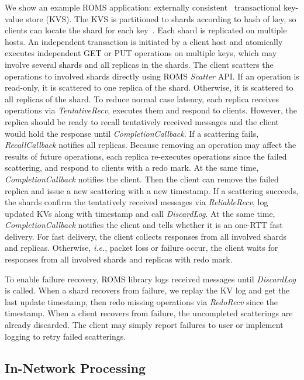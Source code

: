 We show an example ROMS application: externally consistent~\cite{corbett2013spanner} transactional key-value store (KVS).
The KVS is partitioned to shards according to hash of key, so clients can locate the shard for each key~\cite{nishtala2013scaling,eris}.
Each shard is replicated on multiple hosts.
An independent transaction is initiated by a client host and atomically executes independent GET or PUT operations on multiple keys, which may involve several shards and all replicas in the shards.
The client scatters the operations to involved shards directly using ROMS \emph{Scatter} API.
If an operation is read-only, it is scattered to one replica of the shard. Otherwise, it is scattered to all replicas of the shard.
To reduce normal case latency, each replica receives operations via \emph{TentativeRecv}, executes them and respond to clients.
However, the replica should be ready to recall tentatively received messages and the client would hold the response until \emph{CompletionCallback}.
If a scattering fails, \emph{RecallCallback} notifies all replicas.
Because removing an operation may affect the results of future operations, each replica re-executes operations since the failed scattering, and respond to clients with a redo mark.
At the same time, \emph{CompletionCallback} notifies the client. Then the client can remove the failed replica and issue a new scattering with a new timestamp.
If a scattering succeeds, the shards confirm the tentatively received messages via \emph{ReliableRecv}, log updated KVs along with timestamp and call \emph{DiscardLog}.
At the same time, \emph{CompletionCallback} notifies the client and tells whether it is an one-RTT fast delivery.
For fast delivery, the client collects responses from all involved shards and replicas.
Otherwise, \emph{i.e.}, packet loss or failure occur, the client waits for responses from all involved shards and replicas with redo mark.

To enable failure recovery, ROMS library logs received messages until \emph{DiscardLog} is called.
When a shard recovers from failure, we replay the KV log and get the last update timestamp, then redo missing operations via \emph{RedoRecv} since the timestamp.
When a client recovers from failure, the uncompleted scatterings are already discarded.
The client may simply report failures to user or implement logging to retry failed scatterings.
\fi


\subsection{In-Network Processing}
\label{sec:in-network-processing}

